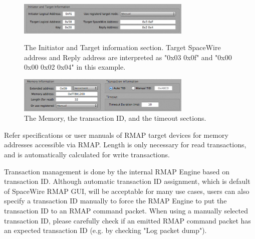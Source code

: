 \documentclass[a4paper,10pt]{article}
\begin{document}
\begin{figure}[htb]
\begin{center}
\begin{minipage}[t]{0.45\hsize}
\begin{center}
\includegraphics[width=8.3cm]{figures/SpaceWireRMAPGUI/RMAPSection_InitiatorAndTargetInformation.png}
\vspace{-2mm}
\caption{The Initiator and Target information section. Target SpaceWire address and Reply address are interpreted as "0x03 0x0f" and "0x00 0x00 0x02 0x04" in this example.}
\label{figure:RMAPSection_InitiatorAndTargetInformation}
\end{center}
\end{minipage}
\hspace{0.05\hsize}
\begin{minipage}[t]{0.45\hsize}
\begin{center}
\includegraphics[width=8.3cm]{figures/SpaceWireRMAPGUI/RMAPSection_MemoryTransactionIDTimeoutInformation.png}
\vspace{-2mm}
\caption{The Memory, the transaction ID, and the timeout sections.}
\label{figure:RMAPSection_MemoryTransactionIDTimeoutInformation}
\end{center}
\end{minipage}
\end{center}
\end{figure}


Refer specifications or user manuals of RMAP target devices for memory addresses accessible via RMAP.
Length is only necessary for read transactions, and is automatically calculated for write transactions.

Transaction management is done by the internal RMAP Engine based on transaction ID.
Although automatic transaction ID assignment, which is default of SpaceWire RMAP GUI, will be acceptable for many use cases, users can also specify a transaction ID manually to force the RMAP Engine to put the transaction ID to an RMAP command packet.
When using a manually selected transaction ID, please carefully check if an emitted RMAP command packet has an expected transaction ID (e.g. by checking "Log packet dump").
\end{document}
